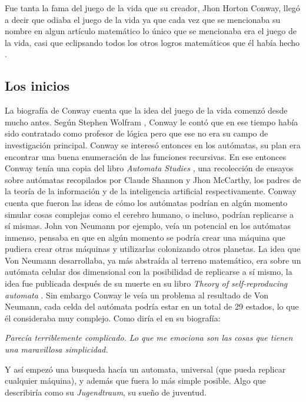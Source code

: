 Fue tanta la fama del juego de la vida que su creador, Jhon Horton Conway, lleg\'o a decir que odiaba el juego de la vida ya que cada vez que se mencionaba su nombre en algun art\'iculo matem\'atico lo \'unico que se mencionaba era el juego de la vida, casi que eclipsando todos los otros logros matem\'aticos que \'el hab\'ia hecho \cite{YTNumberphileConway}.

\subsection{Los inicios}

La biograf\'ia de Conway \cite{Roberts2015-ur} cuenta que la idea del juego de la vida comenz\'o desde mucho antes. Seg\'un Stephen Wolfram \cite{MathematicalArtist2022}, Conway le cont\'o que en ese tiempo hab\'ia sido contratado como profesor de l\'ogica pero que ese no era su campo de investigaci\'on principal. Conway se interes\'o entonces en los aut\'omatas, su plan era encontrar una buena enumeraci\'on de las funciones recursivas. En ese entonces Conway ten\'ia una copia del libro \textit{Automata Studies} \cite{Shannon1956}, una recolecci\'on de ensayos sobre aut\'omatas recopilados por Claude Shannon y Jhon McCarthy, los padres de la teor\'ia de la informaci\'on y de la inteligencia artificial respectivamente. Conway cuenta que fueron las ideas de c\'omo los aut\'omatas podr\'ian en alg\'un momento simular cosas complejas como el cerebro humano, o incluso, podr\'ian replicarse a s\'i mismas. John von Neumann por ejemplo, ve\'ia un potencial en los aut\'omatas inmenso, pensaba en que en alg\'un momento se podr\'ia crear una m\'aquina que pudiera crear otras m\'aquinas y utilizarlas colonizando otros planetas. La idea que Von Neumann desarrollaba, ya m\'as abstra\'ida al terreno matem\'atico, era sobre un aut\'omata celular dos dimensional con la posibilidad de replicarse a s\'i mismo, la idea fue publicada despu\'es de su muerte en su libro \textit{Theory of self-reproducing automata} \cite{Von_Neumann1967-ma}. Sin embargo Conway le ve\'ia un problema al resultado de Von Neumann, cada celda del aut\'omata podr\'ia estar en un total de 29 estados, lo que \'el consideraba muy complejo. Como dir\'ia el en su biograf\'ia:

\textit{Parec\'ia terriblemente complicado. Lo que me emociona son las cosas que tienen una maravillosa simplicidad.}

Y as\'i empez\'o una busqueda hac\'ia un automata, universal (que pueda replicar cualquier m\'aquina), y adem\'as que fuera lo m\'as simple posible. Algo que describir\'ia como su \textit{Jugendtraum}, su sueño de juventud.

